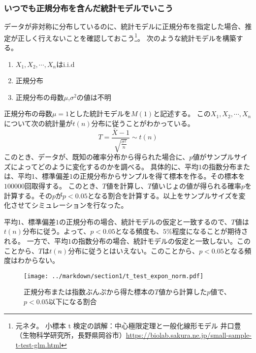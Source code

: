 \documentclass[a4paper,11pt,dvipdfmx]{jsarticle}
\begin{document}
\subsubsection{いつでも正規分布を含んだ統計モデルでいこう}
データが非対称に分布しているのに、統計モデルに正規分布を指定した場合、推定が正しく行えないことを確認しておこう\footnote{元ネタ。
    小標本 t 検定の誤解：中心極限定理と一般化線形モデル 井口豊（生物科学研究所，長野県岡谷市）\url{https://biolab.sakura.ne.jp/small-sample-t-test-glm.html}}。
次のような統計モデルを構築する。
\begin{enumerate}
    \item $X_1,X_2,\cdots,X_n $はi.i.d
    \item 正規分布
    \item 正規分布の母数$\mu$,$\sigma^2$の値は不明
\end{enumerate}
正規分布の母数$\mu=1$とした統計モデルを$M(1)$と記述する。
この$X_1,X_2,\cdots,X_n$について次の統計量が$t(n)$分布に従うことがわかっている。
\begin{equation*}
    T = \frac{\bar{X}-1}{\sqrt{\frac{\sigma^2}{n}}} \sim t(n)
\end{equation*}
このとき、データが、既知の確率分布から得られた場合に、$p$値がサンプルサイズによってどのように変化するのかを調べる。
具体的に、平均$1$の指数分布または、平均$1$、標準偏差$1$の正規分布からサンプルを得て標本を作る。その標本を$100000$回取得する。
このとき、$T$値を計算し、$T$値いじょの値が得られる確率$p$を計算する。その$p$が$p<0.05$となる割合を計算する。以上をサンプルサイズを変化させてシミュレーションを行なった。

平均$1$、標準偏差$1$の正規分布の場合、統計モデルの仮定と一致するので、$T$値は$t(n)$分布に従う。よって、$p<0.05$となる頻度も、$5\%$程度になることが期待される。
一方で、平均$1$の指数分布の場合、統計モデルの仮定と一致しない。このことから、$T$は$t(n)$分布に従うとはいえない。このことから、$p<0.05$となる頻度はわからない。


\begin{figure}
    \begin{center}
        \texttt{[image: ../markdown/section1/t\_test\_expon\_norm.pdf]}
        \caption{正規分布または指数ぶんぷから得た標本の$T$値から計算した$p$値で、$p<0.05$以下になる割合}
    \end{center}
\end{figure}
\end{document}
